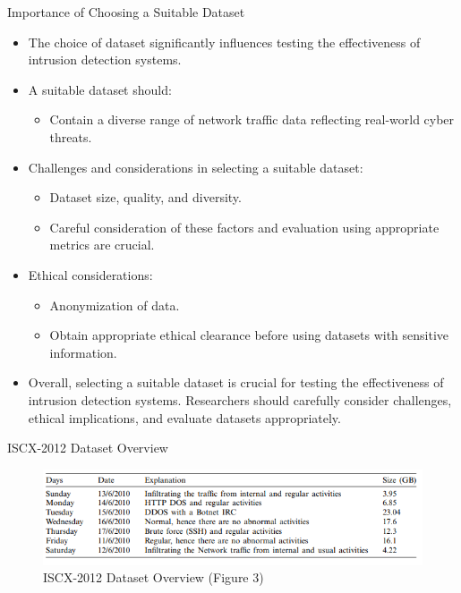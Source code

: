 \documentclass{beamer}
\begin{document}
    \begin{frame}{Importance of Choosing a Suitable Dataset}


  \begin{itemize}
    \item The choice of dataset significantly influences testing the effectiveness of intrusion detection systems.
    \item A suitable dataset should:
      \begin{itemize}
        \item Contain a diverse range of network traffic data reflecting real-world cyber threats.
      \end{itemize}
    \item Challenges and considerations in selecting a suitable dataset:
      \begin{itemize}
        \item Dataset size, quality, and diversity.
        \item Careful consideration of these factors and evaluation using appropriate metrics are crucial.
      \end{itemize}
    \item Ethical considerations:
      \begin{itemize}
        \item Anonymization of data.
        \item Obtain appropriate ethical clearance before using datasets with sensitive information.
      \end{itemize}
    \item Overall, selecting a suitable dataset is crucial for testing the effectiveness of intrusion detection systems. Researchers should carefully consider challenges, ethical implications, and evaluate datasets appropriately.
  \end{itemize}
\end{frame}


\begin{frame}{ISCX-2012 Dataset Overview}

  \begin{figure}
    \centering
    \includegraphics[width=1\textwidth]{Table 2.PNG}
    \caption{ISCX-2012 Dataset Overview (Figure 3)}
  \end{figure}


\end{frame}
\end{document}
